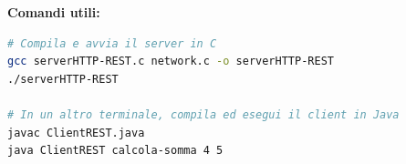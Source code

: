 \documentclass[11pt]{article}
\begin{document}
\begin{tcolorbox}[colback=green!5!white,colframe=green!75!black,title=\textbf{RISPOSTA}, breakable]
\textbf{Comandi utili:}
\begin{lstlisting}[language=bash, basicstyle=\ttfamily\small]
# Compila e avvia il server in C
gcc serverHTTP-REST.c network.c -o serverHTTP-REST
./serverHTTP-REST

# In un altro terminale, compila ed esegui il client in Java
javac ClientREST.java
java ClientREST calcola-somma 4 5
\end{lstlisting}
\end{tcolorbox}
\end{document}
